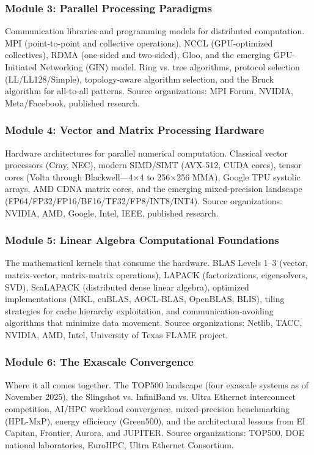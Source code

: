 \documentclass[11pt,letterpaper]{article}
\begin{document}
\subsubsection{Module 3: Parallel Processing Paradigms}
Communication libraries and programming models for distributed computation. MPI (point-to-point and collective operations), NCCL (GPU-optimized collectives), RDMA (one-sided and two-sided), Gloo, and the emerging GPU-Initiated Networking (GIN) model. Ring vs. tree algorithms, protocol selection (LL/LL128/Simple), topology-aware algorithm selection, and the Bruck algorithm for all-to-all patterns. Source organizations: MPI Forum, NVIDIA, Meta/Facebook, published research.

\subsubsection{Module 4: Vector and Matrix Processing Hardware}
Hardware architectures for parallel numerical computation. Classical vector processors (Cray, NEC), modern SIMD/SIMT (AVX-512, CUDA cores), tensor cores (Volta through Blackwell---4$\times$4 to 256$\times$256 MMA), Google TPU systolic arrays, AMD CDNA matrix cores, and the emerging mixed-precision landscape (FP64/FP32/FP16/BF16/TF32/FP8/INT8/INT4). Source organizations: NVIDIA, AMD, Google, Intel, IEEE, published research.

\subsubsection{Module 5: Linear Algebra Computational Foundations}
The mathematical kernels that consume the hardware. BLAS Levels 1--3 (vector, matrix-vector, matrix-matrix operations), LAPACK (factorizations, eigensolvers, SVD), ScaLAPACK (distributed dense linear algebra), optimized implementations (MKL, cuBLAS, AOCL-BLAS, OpenBLAS, BLIS), tiling strategies for cache hierarchy exploitation, and communication-avoiding algorithms that minimize data movement. Source organizations: Netlib, TACC, NVIDIA, AMD, Intel, University of Texas FLAME project.

\subsubsection{Module 6: The Exascale Convergence}
Where it all comes together. The TOP500 landscape (four exascale systems as of November 2025), the Slingshot vs. InfiniBand vs. Ultra Ethernet interconnect competition, AI/HPC workload convergence, mixed-precision benchmarking (HPL-MxP), energy efficiency (Green500), and the architectural lessons from El Capitan, Frontier, Aurora, and JUPITER. Source organizations: TOP500, DOE national laboratories, EuroHPC, Ultra Ethernet Consortium.
\end{document}
